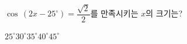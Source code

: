 $\cos\,(2x-25^\circ)=\dfrac{\sqrt{2}}{2}$를 만족시키는 $x$의 크기는? 
\begin{choices32}{$25^\circ$}{$30^\circ$}{$35^\circ$}{$40^\circ$}{$45^\circ$}\end{choices32}
